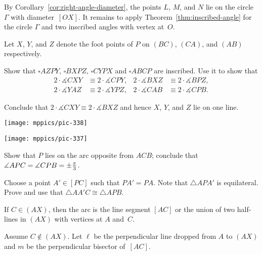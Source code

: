 By Corollary~\ref{cor:right-angle-diameter},
the points $L$, $M$, and $N$ lie on the circle $\Gamma$ with diameter~$[OX]$.
It remains to apply Theorem~\ref{thm:inscribed-angle} for the circle $\Gamma$ 
and two inscribed angles with vertex at~$O$.

Let $X$, $Y$, and $Z$ denote the foot points of $P$ on $(BC)$, $(CA)$, and $(AB)$ respectively.

Show that $\square AZPY$, $\square BXPZ$, $\square CYPX$ and $\square ABCP$ are inscribed.
Use it to show that
\begin{align*}
2\cdot \measuredangle CXY&\equiv 2\cdot \measuredangle CPY,
&
2\cdot \measuredangle BXZ&\equiv 2\cdot \measuredangle BPZ,
\\
2\cdot \measuredangle YAZ&\equiv 2\cdot \measuredangle YPZ,
&
2\cdot \measuredangle CAB&\equiv 2\cdot \measuredangle CPB.
\end{align*}

Conclude that 
$2\cdot \measuredangle CXY\equiv 2\cdot \measuredangle BXZ$
and hence $X$, $Y$, and $Z$ lie on one line.

\medskip

\begin{minipage}{.48\textwidth}
\centering
\texttt{[image: mppics/pic-338]}
\end{minipage}
\hfill
\begin{minipage}{.48\textwidth}
\centering
\texttt{[image: mppics/pic-337]}
\end{minipage}

\medskip


Show that $P$ lies on the arc opposite from $ACB$;
conclude that
$\measuredangle APC\z=\measuredangle CPB\z=\pm\tfrac\pi3$.

Choose a point $A'\in [PC]$ such that $PA'=PA$.
Note that $\triangle APA'$ is equilateral.
Prove and use that $\triangle AA'C\cong \triangle APB$.

If $C\in (AX)$, then the arc is the line segment $[AC]$ or the union of two half-lines in $(AX)$ with vertices at $A$ and~$C$.

Assume $C\notin (AX)$.
Let $\ell$ be the perpendicular line dropped from $A$ to $(AX)$ and $m$ be the perpendicular bisector of~$[AC]$.

